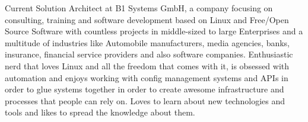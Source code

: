 

\begin{cvparagraph}

Current Solution Architect at B1 Systems GmbH, a company focusing on consulting, training and
software development based on Linux and Free/Open Source Software with countless projects in
middle-sized to large Enterprises and a multitude of industries like Automobile manufacturers, media
agencies, banks, insurance, financial service providers and also software companies. Enthusiastic
nerd that loves Linux and all the freedom that comes with it, is obsessed with automation and enjoys
working with config management systems and APIs in order to glue systems together in order to create awesome
infrastructure and processes that people can rely on. Loves to learn about new technologies and
tools and likes to spread the knowledge about them.
\end{cvparagraph}
